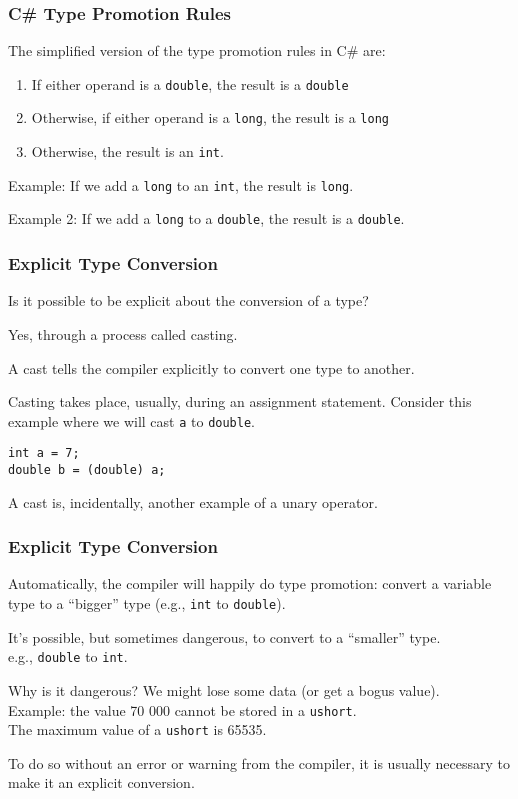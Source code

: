 \begin{frame}
\frametitle{C\# Type Promotion Rules}

The simplified version of the type promotion rules in C\# are:

\begin{enumerate}
	\item If either operand is a \texttt{double}, the result is a \texttt{double}
	\item Otherwise, if either operand is a \texttt{long}, the result is a \texttt{long}
	\item Otherwise, the result is an \texttt{int}.
\end{enumerate}

Example: If we add a \texttt{long} to an \texttt{int}, the result is \texttt{long}.

Example 2: If we add a \texttt{long} to a \texttt{double}, the result is a \texttt{double}.

\end{frame}

\begin{frame}[fragile]
\frametitle{Explicit Type Conversion}
Is it possible to be explicit about the conversion of a type?

Yes, through a process called \alert{casting}.

A \alert{cast} tells the compiler explicitly to convert one type to another.

Casting takes place, usually, during an assignment statement. Consider this example where we will cast \texttt{a} to \texttt{double}.
\vspace{-3em}
\begin{verbatim}
int a = 7;
double b = (double) a;
\end{verbatim}

A cast is, incidentally, another example of a unary operator.

\end{frame}

\begin{frame}
\frametitle{Explicit Type Conversion}
Automatically, the compiler will happily do type promotion: convert a variable type to a ``bigger'' type (e.g., \texttt{int} to \texttt{double}).

It's possible, but sometimes dangerous, to convert to a ``smaller'' type.\\
\quad e.g., \texttt{double} to \texttt{int}.

Why is it dangerous? We might lose some data (or get a bogus value).\\
\quad Example: the value 70 000 cannot be stored in a \texttt{ushort}.\\
\quad The maximum value of a \texttt{ushort} is 65535.

To do so without an error or warning from the compiler, it is usually necessary to make it an explicit conversion.

\end{frame}

